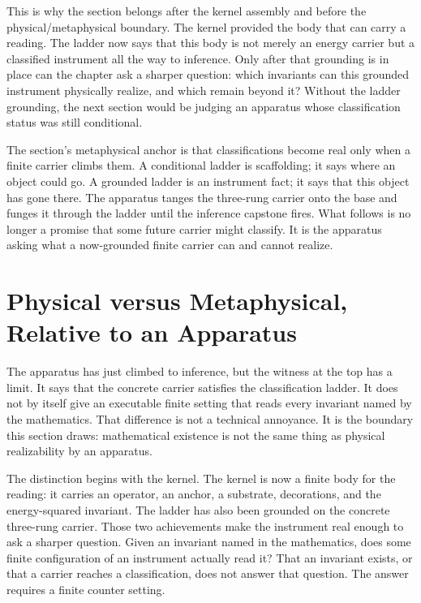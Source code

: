 This is why the section belongs after the kernel assembly and before the
physical/metaphysical boundary. The kernel provided the body that can carry a
reading. The ladder now says that this body is not merely an energy carrier but a
classified instrument all the way to inference. Only after that grounding is in
place can the chapter ask a sharper question: which invariants can this grounded
instrument physically realize, and which remain beyond it? Without the ladder
grounding, the next section would be judging an apparatus whose classification
status was still conditional.

The section's metaphysical anchor is that classifications become real only when
a finite carrier climbs them. A conditional ladder is scaffolding; it says where
an object could go. A grounded ladder is an instrument fact; it says that this
object has gone there. The apparatus tanges the three-rung carrier onto the base
and funges it through the ladder until the inference capstone fires. What follows
is no longer a promise that some future carrier might classify. It is the
apparatus asking what a now-grounded finite carrier can and cannot realize.

\section{Physical versus Metaphysical, Relative to an Apparatus}

The apparatus has just climbed to inference, but the witness at the top has a
limit. It says that the concrete carrier satisfies the classification ladder. It
does not by itself give an executable finite setting that reads every invariant
named by the mathematics. That difference is not a technical annoyance. It is
the boundary this section draws: mathematical existence is not the same thing as
physical realizability by an apparatus.

The distinction begins with the kernel. The kernel is now a finite body for the
reading: it carries an operator, an anchor, a substrate, decorations, and the
energy-squared invariant. The ladder has also been grounded on the concrete
three-rung carrier. Those two achievements make the instrument real enough to
ask a sharper question. Given an invariant named in the mathematics, does some
finite configuration of an instrument actually read it? That an invariant
exists, or that a carrier reaches a classification, does not answer that
question. The answer requires a finite counter setting.

